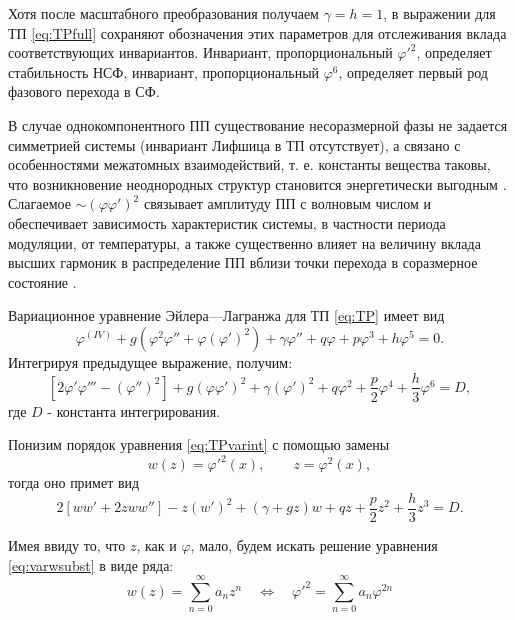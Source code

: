 Хотя после масштабного преобразования получаем $\gamma=h=1$, в выражении для ТП \eqref{eq:TPfull} сохраняют обозначения этих параметров для отслеживания вклада соответствующих инвариантов.
Инвариант, пропорциональный $\varphi'^2$, определяет стабильность НСФ, инвариант, пропорциональный $\varphi^6$, определяет первый род фазового перехода в СФ.

В случае однокомпонентного ПП существование несоразмерной фазы не задается симметрией системы (инвариант Лифшица в ТП отсутствует), а связано с особенностями  межатомных взаимодействий, т. е. константы вещества таковы, что возникновение неоднородных структур становится энергетически выгодным \cite{Klepikov1996}.
Слагаемое $\sim\left(\varphi\varphi'\right)^2$ связывает амплитуду ПП с волновым числом и обеспечивает зависимость характеристик системы, в частности периода модуляции, от температуры, а также существенно влияет на величину вклада высших гармоник в распределение ПП вблизи точки перехода в соразмерное состояние \cite{Berezovsky1998, Berezovsky1998ua}.

Вариационное уравнение Эйлера—Лагранжа для ТП \eqref{eq:TP} имеет вид
\begin{equation}
\varphi^{(IV)} + 
g\left(\varphi^2\varphi'' + \varphi\left(\varphi'\right)^2\right) +
\gamma\varphi'' + q\varphi + p\varphi^3 + h\varphi^5 = 0.
\label{eq:TPvar}
\end{equation}
Интегрируя предыдущее выражение, получим:
\begin{equation}
\left[2\varphi'\varphi''' - \left(\varphi''\right)^2\right] +
g\left(\varphi\varphi'\right)^2 + \gamma\left(\varphi'\right)^2 +
q\varphi^2 +\frac{p}{2}\varphi^4 + \frac{h}{3}\varphi^6 = D,
\label{eq:TPvarint}
\end{equation}
где $D$ - константа интегрирования.

Понизим порядок уравнения \eqref{eq:TPvarint} с помощью замены
\begin{equation}
w(z) = \varphi'^2(x), \qquad z = \varphi^2(x),
\label{eq:wsubst}
\end{equation}
тогда оно примет вид
\begin{equation}
2\left[ww' + 2zww''\right] - z\left(w'\right)^2 + (\gamma+gz)w +
qz +\frac{p}{2}z^2 + \frac{h}{3}z^3 = D.
\label{eq:varwsubst}
\end{equation}

Имея ввиду то, что $z$, как и $\varphi$, мало, будем искать решение уравнения \eqref{eq:varwsubst} в виде ряда:
\begin{equation}
w(z) = \sum_{n=0}^\infty a_n z^n \quad \Leftrightarrow \quad 
\varphi'^2 = \sum_{n=0}^\infty a_n \varphi^{2n}
\label{eq:wseriesinf}
\end{equation}

